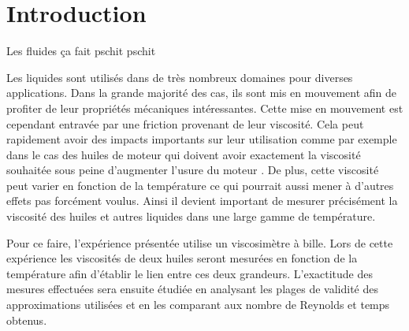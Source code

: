 \section{Introduction}
Les fluides ça fait pschit pschit

Les liquides sont utilisés dans de très nombreux domaines pour diverses applications. Dans la grande majorité des cas, ils sont mis en mouvement afin de profiter de leur propriétés mécaniques intéressantes. Cette mise en mouvement est cependant entravée par une friction provenant de leur viscosité. Cela peut rapidement avoir des impacts importants sur leur utilisation comme par exemple dans le cas des huiles de moteur qui doivent avoir exactement la viscosité souhaitée sous peine d'augmenter l'usure du moteur \cite{roger_le_mecano}. De plus, cette viscosité peut varier en fonction de la température ce qui pourrait aussi mener à d'autres effets pas forcément voulus. Ainsi il devient important de mesurer précisément la viscosité des huiles et autres liquides dans une large gamme de température.

Pour ce faire, l'expérience présentée utilise un viscosimètre à bille. Lors de cette expérience les viscosités de deux huiles seront mesurées en fonction de la température afin d'établir le lien entre ces deux grandeurs. L'exactitude des mesures effectuées sera ensuite étudiée en analysant les plages de validité des approximations utilisées et en les comparant aux nombre de Reynolds et temps obtenus.